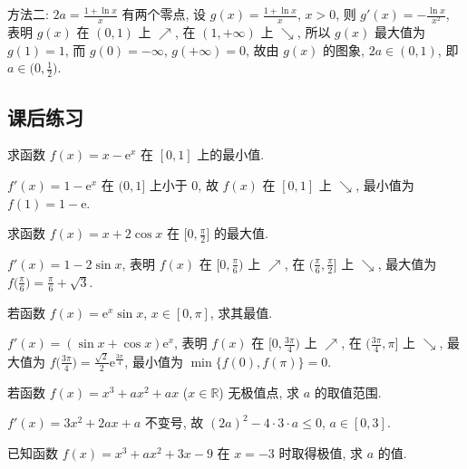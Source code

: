     方法二: $2a=\frac{1+\ln x}x$ 有两个零点, 设 $g(x)=\frac{1+\ln x}x$, $x>0$, 则 $g'(x)=-\frac{\ln x}{x^2}$, 表明 $g(x)$ 在 $(0,1)$ 上 $\nearrow$, 在 $(1,+\infty)$ 上 $\searrow$, 所以 $g(x)$ 最大值为 $g(1)=1$, 而 $g(0)=-\infty$, $g(+\infty)=0$, 故由 $g(x)$ 的图象, $2a\in(0,1)$, 即 $a\in\Big(0,\frac12\Big)$.
  \endsolution
  
  \subsection{课后练习}
  \begin{exercise}
    求函数 $f(x)=x-\mathrm{e}^x$ 在 $[0,1]$ 上的最小值.
  \end{exercise}

  \beginsolution
    $f'(x)=1-\mathrm{e}^x$ 在 $(0,1]$ 上小于 $0$, 故 $f(x)$ 在 $[0,1]$ 上 $\searrow$, 最小值为 $f(1)=1-\mathrm{e}$.
  \endsolution
  
  \begin{exercise}
    求函数 $f(x)=x+2\cos x$ 在 $\Big[0,\frac{\pi}2\Big]$ 的最大值.
  \end{exercise}

  \beginsolution
    $f'(x)=1-2\sin x$, 表明 $f(x)$ 在 $\Big[0,\frac\pi6\Big)$ 上 $\nearrow$, 在 $\Big(\frac\pi6,\frac{\pi}2\Big]$ 上 $\searrow$, 最大值为 $f\Big(\frac\pi6\Big)= \frac\pi6+\sqrt3$.
  \endsolution
  
  \begin{exercise}
    若函数 $f(x)=\mathrm{e}^x\sin x$, $x\in[0,\pi]$, 求其最值.
  \end{exercise}

  \beginsolution
    $f'(x)=(\sin x+\cos x)\mathrm{e}^x$, 表明 $f(x)$ 在 $\Big[0,\frac{3\pi}4\Big)$ 上 $\nearrow$, 在 $\Big(\frac{3\pi}4,\pi\Big]$ 上 $\searrow$, 最大值为 $f\Big(\frac{3\pi}4\Big)= \frac{\sqrt2}2\mathrm{e}^{\frac{3\pi}4}$, 最小值为 $\min\{f(0),f(\pi)\}=0$.
  \endsolution
  
  \begin{exercise}
    若函数 $f(x)=x^3 +ax^2 +ax$ ($x\in\mathbb{R}$) 无极值点,
    求 $a$ 的取值范围.
  \end{exercise}

  \beginsolution
    $f'(x)=3x^2+2ax+a$ 不变号, 故 $(2a)^2-4\cdot 3\cdot a\leqslant 0$,  $a\in[0,3]$.
  \endsolution
  
  \begin{exercise}
    已知函数 $f(x)=x^3 +ax^2 +3x-9$ 在 $x=-3$ 时取得极值, 求 $a$ 的值.
  \end{exercise}

